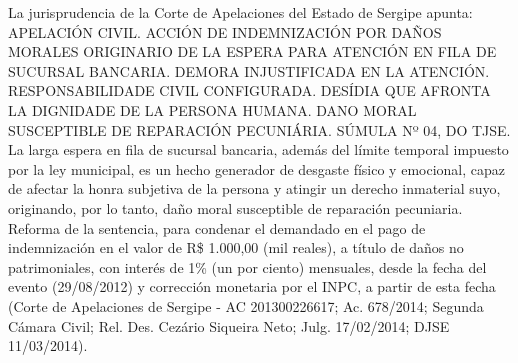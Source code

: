 La jurisprudencia de la Corte de Apelaciones del Estado de Sergipe apunta:
APELACIÓN CIVIL. ACCIÓN DE INDEMNIZACIÓN POR DAÑOS MORALES ORIGINARIO DE LA ESPERA PARA ATENCIÓN EN FILA DE SUCURSAL BANCARIA. DEMORA INJUSTIFICADA EN LA ATENCIÓN. RESPONSABILIDADE CIVIL CONFIGURADA. DESÍDIA QUE AFRONTA LA DIGNIDADE DE LA PERSONA HUMANA. DANO MORAL SUSCEPTIBLE DE REPARACIÓN PECUNIÁRIA. SÚMULA Nº 04, DO TJSE. La larga espera en fila de sucursal bancaria, además del límite temporal impuesto por la ley municipal, es un hecho generador de desgaste físico y emocional, capaz de afectar la honra subjetiva de la persona y atingir un derecho inmaterial suyo, originando, por lo tanto, daño moral susceptible de reparación pecuniaria. Reforma de la sentencia, para condenar el demandado en el pago de indemnización en el valor de R\$ 1.000,00 (mil reales), a título de daños no patrimoniales, con interés de 1\% (un por ciento) mensuales, desde la fecha del evento (29/08/2012) y corrección monetaria por el INPC, a partir de esta fecha (Corte de Apelaciones de Sergipe - AC 201300226617; Ac. 678/2014; Segunda Cámara Civil; Rel. Des. Cezário Siqueira Neto; Julg. 17/02/2014; DJSE 11/03/2014).\\
